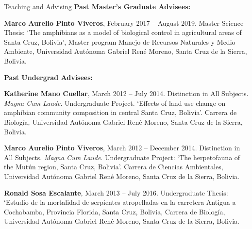 \documentclass{resume} %
\begin{document}
\begin{rSection}{Teaching and Advising}
\textbf{Past Master's Graduate Advisees:}

\textbf{Marco Aurelio Pinto Viveros}, February 2017 – August 2019. Master Science Thesis: `The amphibians as a model of biological control in agricultural areas of Santa Cruz, Bolivia', Master program Manejo de Recursos Naturales y Medio Ambiente, Universidad Autónoma Gabriel René Moreno, Santa Cruz de la Sierra, Bolivia.

\textbf{Past Undergrad Advisees:}

\textbf{Katherine Mano Cuellar}, March 2012 – July 2014. Distinction in All Subjects. {\em Magna Cum Laude}. Undergraduate Project. `Effects of land use change on amphibian community composition in central Santa Cruz, Bolivia'. Carrera de Biología, Universidad Autónoma Gabriel René Moreno, Santa Cruz de la Sierra, Bolivia.

\textbf{Marco Aurelio Pinto Viveros}, March 2012 – December 2014. Distinction in All Subjects. {\em Magna Cum Laude}. Undergraduate Project: `The herpetofauna of the Mutún region, Santa Cruz, Bolivia'. Carrera de Ciencias Ambientales, Universidad Autónoma Gabriel René Moreno, Santa Cruz de la Sierra, Bolivia.

\textbf{Ronald Sosa Escalante}, March 2013 – July 2016. Undergraduate Thesis: `Estudio de la mortalidad de serpientes atropelladas en la carretera Antigua a Cochabamba, Provincia Florida, Santa Cruz, Bolivia, Carrera de Biología, Universidad Autónoma Gabriel René Moreno, Santa Cruz de la Sierra, Bolivia.

\end{rSection}

\end{document}
